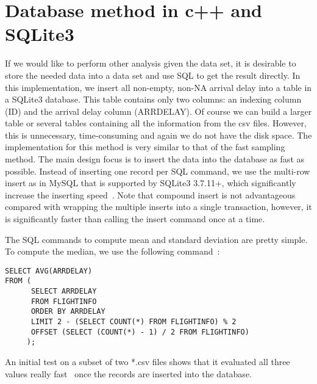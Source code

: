 \documentclass{article}
\begin{document}
\section{Database method in c++ and SQLite3}
\lstset{language=SQL,breaklines=true}
If we would like to perform other analysis given the data set, it is desirable to store the needed data into a data set and use SQL to get the result directly. In this implementation, we insert all non-empty, non-NA arrival delay into a table in a SQLite3 database. This table contains only two columns: an indexing column (ID) and the arrival delay column (ARRDELAY). Of course we can build a larger table or several tables containing all the information from the csv files. However, this is unnecessary, time-consuming and again we do not have the disk space. The implementation for this method is very similar to that of the fast sampling method. The main design focus is to insert the data into the database as fast as possible. Instead of inserting one record per SQL command, we use the multi-row insert as in MySQL that is supported by SQLite3 3.7.11+, which significantly increase the inserting speed~\cite{MultipleRow}. Note that compound insert is not advantageous compared with wrapping the multiple inserts into a single transaction, however, it is significantly faster than calling the insert command once at a time.

The SQL commands to compute mean and standard deviation are pretty simple. To compute the median, we use the following command~\cite{Median}:
\begin{lstlisting}
SELECT AVG(ARRDELAY)
FROM (
      SELECT ARRDELAY 
      FROM FLIGHTINFO
      ORDER BY ARRDELAY
      LIMIT 2 - (SELECT COUNT(*) FROM FLIGHTINFO) % 2
	  OFFSET (SELECT (COUNT(*) - 1) / 2 FROM FLIGHTINFO)
     );
\end{lstlisting}
An initial test on a subset of two *.csv files shows that it evaluated all three values really fast~\cite{FastSample} once the records are inserted into the database.





\end{document}
